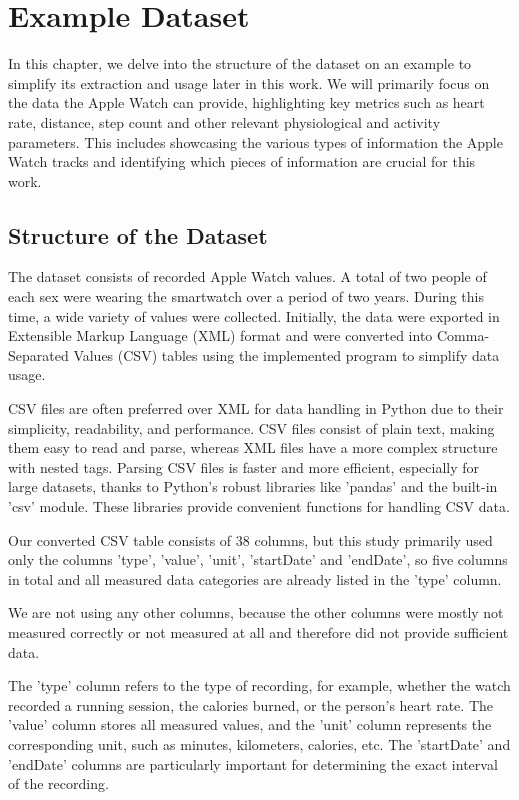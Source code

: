 \chapter{Example Dataset}
\label{cha:exampleDataset}

In this chapter, we delve into the structure of the dataset on an example to simplify its extraction and usage later in this work. We will primarily focus on the data the Apple Watch can provide, highlighting key metrics such as heart rate, distance, step count and other relevant physiological and activity parameters. This includes showcasing the various types of information the Apple Watch tracks and identifying which pieces of information are crucial for this work.

\section{Structure of the Dataset}

The dataset consists of recorded Apple Watch values. A total of two people of each sex were wearing the smartwatch over a period of two years. During this time, a wide variety of values were collected. Initially, the data were exported in Extensible Markup Language (XML) format and were converted into Comma-Separated Values (CSV) tables using the implemented program to simplify data usage. 

CSV files are often preferred over XML for data handling in Python due to their simplicity, readability, and performance. CSV files consist of plain text, making them easy to read and parse, whereas XML files have a more complex structure with nested tags. Parsing CSV files is faster and more efficient, especially for large datasets, thanks to Python's robust libraries like 'pandas' and the built-in 'csv' module. These libraries provide convenient functions for handling CSV data.

Our converted CSV table consists of 38 columns, but this study primarily used only the columns 'type', 'value', 'unit', 'startDate' and 'endDate', so five columns in total and all measured data categories are already listed in the 'type' column.

We are not using any other columns, because the other columns were mostly not measured correctly or not measured at all and therefore did not provide sufficient data. 

The 'type' column refers to the type of recording, for example, whether the watch recorded a running session, the calories burned, or the person's heart rate. The 'value' column stores all measured values, and the 'unit' column represents the corresponding unit, such as minutes, kilometers, calories, etc. The 'startDate' and 'endDate' columns are particularly important for determining the exact interval of the recording.

